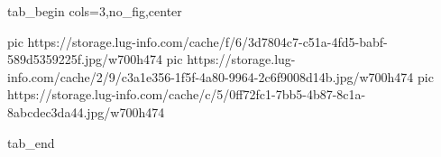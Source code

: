  
 
 
 
 


\ifcmt
  tab_begin cols=3,no_fig,center

     pic https://storage.lug-info.com/cache/f/6/3d7804c7-c51a-4fd5-babf-589d5359225f.jpg/w700h474%
		 pic https://storage.lug-info.com/cache/2/9/c3a1e356-1f5f-4a80-9964-2c6f9008d14b.jpg/w700h474%
		 pic https://storage.lug-info.com/cache/c/5/0ff72fc1-7bb5-4b87-8c1a-8abcdec3da44.jpg/w700h474%

  tab_end
\fi
